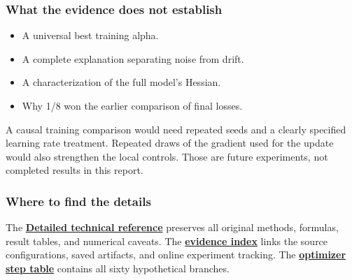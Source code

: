 \documentclass[
  14pt,
  letterpaper,
]{extarticle}
\providecommand{\tightlist}{%
  \setlength{\itemsep}{0pt}\setlength{\parskip}{0pt}}
\let\reportsubsubsection\subsubsection
\renewcommand{\subsubsection}{\Needspace{5\baselineskip}\reportsubsubsection}
\begin{document}
\subsubsection{What the evidence does not
establish}\label{what-the-evidence-does-not-establish}

\begin{itemize}
\tightlist
\item
  A universal best training alpha.
\item
  A complete explanation separating noise from drift.
\item
  A characterization of the full model's Hessian.
\item
  Why 1/8 won the earlier comparison of final losses.
\end{itemize}

A causal training comparison would need repeated seeds and a clearly
specified learning rate treatment. Repeated draws of the gradient used
for the update would also strengthen the local controls. Those are
future experiments, not completed results in this report.

\subsubsection{Where to find the
details}\label{where-to-find-the-details}

The \href{technical-reference.pdf}{\textbf{Detailed technical
reference}} preserves all original methods, formulas, result tables, and
numerical caveats. The \href{evidence-index.md}{\textbf{evidence index}}
links the source configurations, saved artifacts, and online experiment
tracking. The \href{optimizer-step-results.csv}{\textbf{optimizer step
table}} contains all sixty hypothetical branches.
\end{document}

